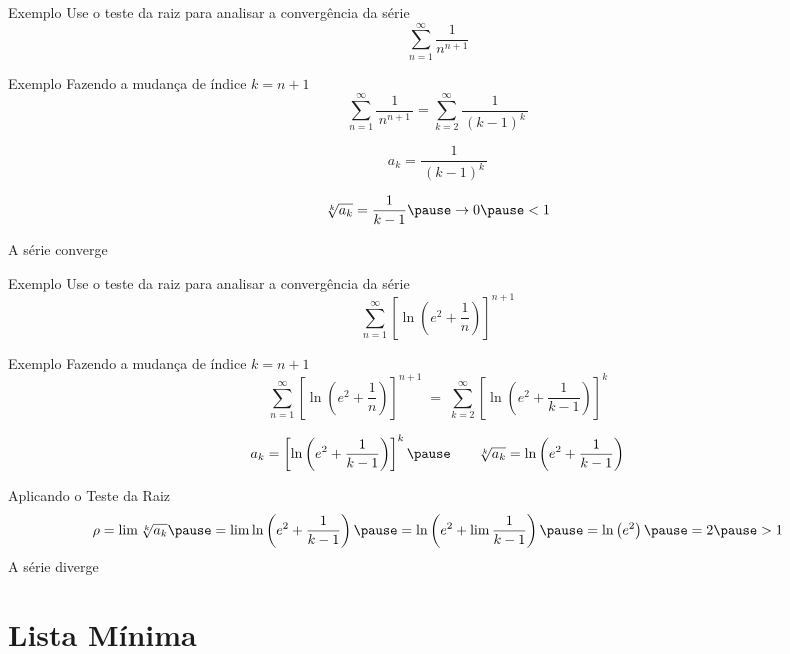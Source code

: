 \addtocounter{exemplo}{1}
\begin{frame}{Exemplo \theexemplo}
  Use o teste da raiz para analisar a convergência da série
  \[
    \sum_{n=1}^\infty\frac{1}{n^{n+1}}
  \]
\end{frame}

\begin{frame}{Exemplo \theexemplo}
  Fazendo a mudança de índice \(k=n+1\)
  \[
    \sum_{n=1}^\infty\frac{1}{\, n^{n+1}\,} =
    \sum_{k=2}^\infty\frac{1}{\,(k-1)^{k}\,}
  \]

  \pause
  \[
    a_k = \frac{1}{\,(k-1)^{k}\,}
  \]

  \pause
  \[
    \sqrt[k]{a_k}
    = \frac{1}{k-1}
    \pause
    \to 0
    \pause
    < 1
  \]

  A série converge
\end{frame}

\addtocounter{exemplo}{1}
\begin{frame}{Exemplo \theexemplo}
  Use o teste da raiz para analisar a convergência da série
  \[
    \sum_{n=1}^\infty \left[\ln\left(e^2+\frac{1}{n}\right)\right]^{n+1}
  \]
\end{frame}

\begin{frame}{Exemplo \theexemplo}
  Fazendo a mudança de índice \(k=n+1\)
  \[
    \sum_{n=1}^\infty \left[\ln\left(e^2+\frac{1}{n}  \right)\right]^{n+1} \;=\;
    \sum_{k=2}^\infty \left[\ln\left(e^2+\frac{1}{k-1}\right)\right]^{k}
  \]

  \pause
  \[
    a_k
    = \left[\ln\left( e^2 + \frac{1}{k-1} \right)\right]^k
    \pause
    \qquad
    \sqrt[k]{a_k}
    = \ln\left(e^2+\frac{1}{k-1}\right)
  \]

  \pause
  Aplicando o Teste da Raiz
  \[
    \rho
    = \lim \sqrt[k]{a_k}
    \pause
    = \lim \ln\left(e^2+\frac{1}{k-1}\right)
    \pause
    = \ln \left(e^2+ \lim\frac{1}{k-1}\right)
    \pause
    = \ln \left(e^2\right)
    \pause
    = 2
    \pause
    > 1
  \]
  A série diverge
\end{frame}

\section{Lista Mínima}

